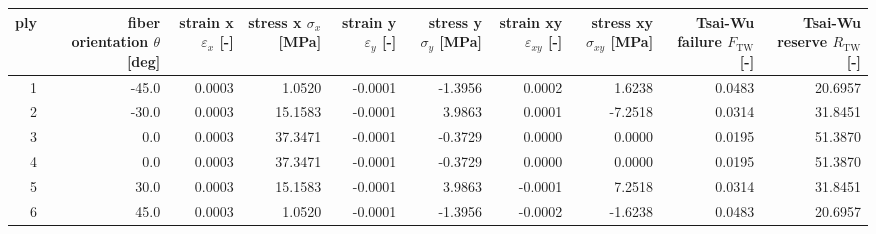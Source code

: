 \begin{tabular}{rrrrrrrrrr}
\toprule
ply & fiber orientation $\theta$ [deg] & strain x $\varepsilon_x$ [-] & stress x $\sigma_x$ [MPa] & strain y $\varepsilon_y$ [-] & stress y $\sigma_y$ [MPa] & strain xy $\varepsilon_{xy}$ [-] & stress xy $\sigma_{xy}$ [MPa] & Tsai-Wu failure $F_\mathrm{TW}$ [-] & Tsai-Wu reserve $R_\mathrm{TW}$ [-] \\
\midrule
  1 &                            -45.0 &                       0.0003 &                    1.0520 &                      -0.0001 &                   -1.3956 &                           0.0002 &                        1.6238 &                              0.0483 &                             20.6957 \\
  2 &                            -30.0 &                       0.0003 &                   15.1583 &                      -0.0001 &                    3.9863 &                           0.0001 &                       -7.2518 &                              0.0314 &                             31.8451 \\
  3 &                              0.0 &                       0.0003 &                   37.3471 &                      -0.0001 &                   -0.3729 &                           0.0000 &                        0.0000 &                              0.0195 &                             51.3870 \\
  4 &                              0.0 &                       0.0003 &                   37.3471 &                      -0.0001 &                   -0.3729 &                           0.0000 &                        0.0000 &                              0.0195 &                             51.3870 \\
  5 &                             30.0 &                       0.0003 &                   15.1583 &                      -0.0001 &                    3.9863 &                          -0.0001 &                        7.2518 &                              0.0314 &                             31.8451 \\
  6 &                             45.0 &                       0.0003 &                    1.0520 &                      -0.0001 &                   -1.3956 &                          -0.0002 &                       -1.6238 &                              0.0483 &                             20.6957 \\
\bottomrule
\end{tabular}
